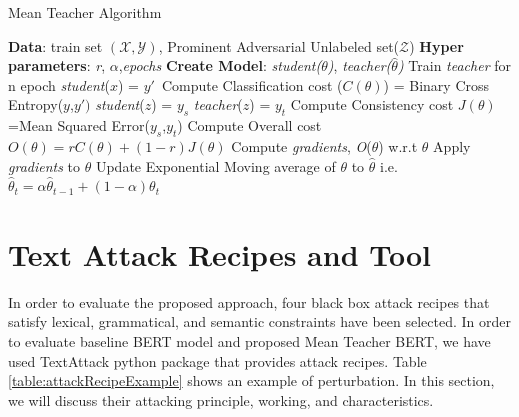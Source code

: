 \documentclass[%
	BCOR=8mm, %
	DIV=12,
	toc=bibliography, %
	toc=listof, %
	oneside, %
	egregdoesnotlikesansseriftitles, %
	]{scrbook}
\begin{document}
\begin{algorithm}[H]
    \caption{Mean Teacher Algorithm} \label{alg:MeanTeacher}
    \begin{algorithmic}
        \STATE \textbf{Data}: train set $\mathcal{(X,Y)}$,  Prominent Adversarial Unlabeled set($\mathcal{Z}$)
        \STATE \textbf{Hyper parameters}: \emph{r}, \emph{$\alpha$},\emph{epochs}
        \STATE \textbf{Create Model}: \emph{student($\theta$)}, \emph{teacher($\hat\theta$)} 
        \STATE  Train \emph{teacher} for n epoch
        \STATE  \emph{student}($x$) = $y'$\
        \STATE Compute Classification cost ($C(\theta)$) = Binary Cross Entropy($y$,$y')$
        \STATE  \emph{student}($z$) = $y_s$
        \STATE  \emph{teacher}($z$) = $y_t$
        \STATE Compute Consistency cost $J(\theta)$=Mean Squared Error($y_s$,$y_{t}$)
        \STATE Compute Overall cost  $\textit{O}(\theta)= r C(\theta)+(1-r)J(\theta)$
        \STATE Compute \emph{gradients}, \textit{O}($\theta$) w.r.t  $\theta$ 
        \STATE Apply \emph{gradients} to $\theta$
        \STATE Update Exponential Moving average of $\theta$ to $\hat\theta$ i.e. $\hat\theta_t= \alpha\hat\theta_{t-1}+(1-\alpha)\theta_t$\
        \ENDWHILE
        \ENDFOR
    \end{algorithmic}
\end{algorithm}

\section{Text Attack Recipes and Tool}
\label{section:attackrecipes}
In order to evaluate the proposed approach, four black box attack recipes that satisfy lexical, grammatical, and semantic constraints have been selected. In order to evaluate baseline BERT model and proposed Mean Teacher BERT, we have used TextAttack python package\cite{morris_textattack_2020}  that provides attack recipes. Table \ref{table:attackRecipeExample} shows an example of perturbation. In this section, we will discuss their attacking principle, working, and characteristics.
\end{document}
